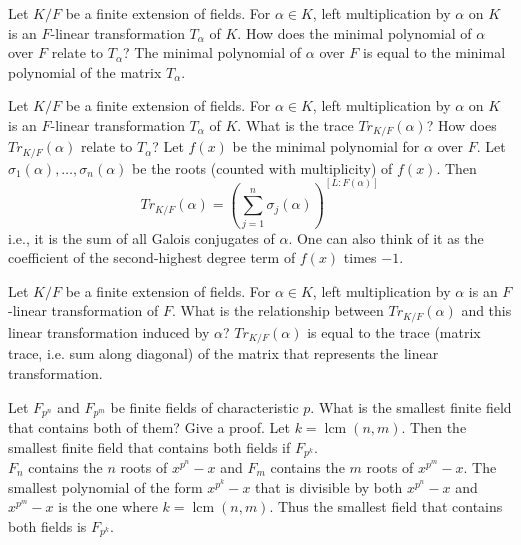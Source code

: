 \documentclass[avery5371,grid]{flashcards}
\DeclareMathOperator{\lcm}{lcm}
\begin{document}
\begin{flashcard}[Fields]{Let $K/F$ be a finite extension of fields. For $\alpha \in K$, left multiplication by $\alpha$ on $K$ is an $F$-linear transformation $T_\alpha$ of $K$. How does the minimal polynomial of $\alpha$ over $F$ relate to $T_\alpha$?}
 The minimal polynomial of $\alpha$ over $F$ is equal to the minimal polynomial of the matrix $T_\alpha$.
\end{flashcard}

\begin{flashcard}[Fields]{Let $K/F$ be a finite extension of fields. For $\alpha \in K$, left multiplication by $\alpha$ on $K$ is an $F$-linear transformation $T_\alpha$ of $K$. What is the trace $Tr_{K/F}(\alpha)$? How does $Tr_{K/F}(\alpha)$ relate to $T_\alpha$?}
  Let $f(x)$ be the minimal polynomial for $\alpha$ over $F$. Let $\sigma_1(\alpha), \ldots, \sigma_n(\alpha)$ be the roots (counted with multiplicity) of $f(x)$. Then
 $$
 Tr_{K/F}(\alpha) = \left ( \sum_{j=1}^n \sigma_j(\alpha) \right) ^{[L:F(\alpha)]}
 $$
 i.e., it is the sum of all Galois conjugates of $\alpha$. One can also think of it as the coefficient of the second-highest degree term of $f(x)$ times $-1$.
\end{flashcard}

\begin{flashcard}[Fields]{Let $K/F$ be a finite extension of fields. For $\alpha \in K$, left multiplication by $\alpha$ is an $F$-linear transformation of $F$. What is the relationship between $Tr_{K/F}(\alpha)$ and this linear transformation induced by $\alpha$?}
 $Tr_{K/F}(\alpha)$ is equal to the trace (matrix trace, i.e. sum along diagonal) of the matrix that represents the linear transformation.
\end{flashcard}

\begin{flashcard}[Fields]{Let $F_{p^n}$ and $F_{p^m}$ be finite fields of characteristic $p$. What is the smallest finite field that contains both of them? Give a proof.}
 Let $k = \lcm(n,m)$. Then the smallest finite field that contains both fields if $F_{p^k}$.\\
 
 $F_n$ contains the $n$ roots of $x^{p^n} - x$ and $F_m$ contains the $m$ roots of $x^{p^m} - x$. The smallest polynomial of the form $x^{p^k} - x$ that is divisible by both $x^{p^n} - x$ and $x^{p^m} - x$ is the one where $k = \lcm(n,m)$. Thus the smallest field that contains both fields is $F_{p^k}.$
\end{flashcard}
\end{document}
